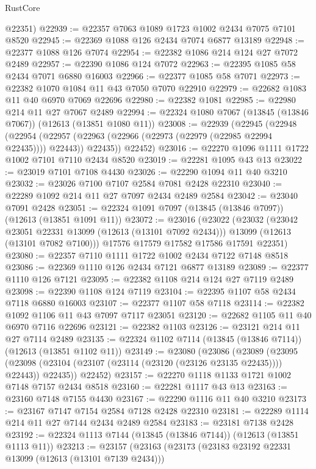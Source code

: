 \begin{lexlean}{RustCore}
\begin{coremodule}
      @22351)
@22939 := @22357 @7063 @1089 @1723 @1002 @2434 @7075 @7101 @8520
@22945 := @22369 @1088 @126 @2434 @7074 @6877 @13189
@22948 := @22377 @1088 @126 @7074
@22954 := @22382 @1086 @214 @124 @27 @7072 @2489
@22957 := @22390 @1086 @124 @7072
@22963 := @22395 @1085 @58 @2434 @7071 @6880 @16003
@22966 := @22377 @1085 @58 @7071
@22973 := @22382 @1070 @1084 @11 @43 @7050 @7070 @22910
@22979 := @22682 @1083 @11 @40 @6970 @7069 @22696
@22980 := @22382 @1081
@22985 := @22980 @214 @11 @27 @7067 @2489
@22994 := @22324 @1080 @7067 (@13845 (@13846 @7067)) (@12613 (@13851 @1080 @11))
@23008 := @22939
    (@22945
      (@22948
        (@22954 (@22957 (@22963 (@22966 (@22973 (@22979 (@22985 @22994 @22435)))) @22443)) @22435))
      @22452)
@23016 := @22270 @1096 @1111 @1722 @1002 @7101 @7110 @2434 @8520
@23019 := @22281 @1095 @43 @13
@23022 := @23019 @7101 @7108 @4430
@23026 := @22290 @1094 @11 @40 @3210
@23032 := @23026 @7100 @7107 @2584 @7081 @2428 @22310
@23040 := @22289 @1092 @214 @11 @27 @7097 @2434 @2489 @2584
@23042 := @23040 @7091 @2428
@23051 := @22324 @1091 @7097 (@13845 (@13846 @7097)) (@12613 (@13851 @1091 @11))
@23072 := @23016
    (@23022
      (@23032
        (@23042 @23051 @22331 @13099 (@12613 (@13101 @7092 @2434)))
        @13099
        (@12613 (@13101 @7082 @7100)))
      @17576
      @17579
      @17582
      @17586
      @17591
      @22351)
@23080 := @22357 @7110 @1111 @1722 @1002 @2434 @7122 @7148 @8518
@23086 := @22369 @1110 @126 @2434 @7121 @6877 @13189
@23089 := @22377 @1110 @126 @7121
@23095 := @22382 @1108 @214 @124 @27 @7119 @2489
@23098 := @22390 @1108 @124 @7119
@23104 := @22395 @1107 @58 @2434 @7118 @6880 @16003
@23107 := @22377 @1107 @58 @7118
@23114 := @22382 @1092 @1106 @11 @43 @7097 @7117 @23051
@23120 := @22682 @1105 @11 @40 @6970 @7116 @22696
@23121 := @22382 @1103
@23126 := @23121 @214 @11 @27 @7114 @2489
@23135 := @22324 @1102 @7114 (@13845 (@13846 @7114)) (@12613 (@13851 @1102 @11))
@23149 := @23080
    (@23086
      (@23089
        (@23095 (@23098 (@23104 (@23107 (@23114 (@23120 (@23126 @23135 @22435)))) @22443)) @22435))
      @22452)
@23157 := @22270 @1118 @1133 @1721 @1002 @7148 @7157 @2434 @8518
@23160 := @22281 @1117 @43 @13
@23163 := @23160 @7148 @7155 @4430
@23167 := @22290 @1116 @11 @40 @3210
@23173 := @23167 @7147 @7154 @2584 @7128 @2428 @22310
@23181 := @22289 @1114 @214 @11 @27 @7144 @2434 @2489 @2584
@23183 := @23181 @7138 @2428
@23192 := @22324 @1113 @7144 (@13845 (@13846 @7144)) (@12613 (@13851 @1113 @11))
@23213 := @23157
    (@23163
      (@23173
        (@23183 @23192 @22331 @13099 (@12613 (@13101 @7139 @2434)))

\end{coremodule}
\end{lexlean}
